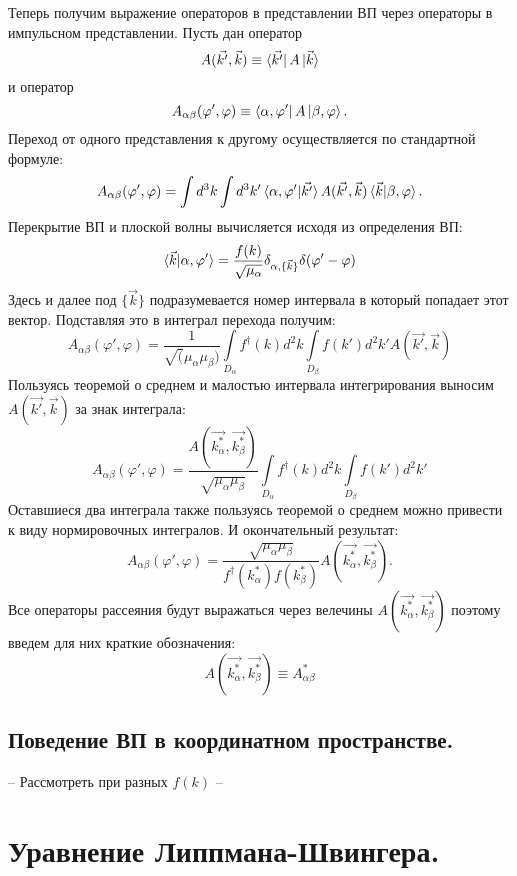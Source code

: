 \documentclass[a4paper,12pt]{article}
\begin{document}
Теперь получим выражение операторов в представлении ВП через операторы в импульсном представлении. Пусть дан оператор
\[
	A(\vec{k'},\vec{k}) \equiv \bra{\vec{k'}}A\ket{\vec{k}}
\] и оператор \[
  A_{\alpha\beta}(\varphi',\varphi) \equiv \bra{\alpha,\varphi'}A\ket{\beta,\varphi}.
\]
Переход от одного представления к другому осуществляется по стандартной формуле:
\[
	A_{\alpha\beta}(\varphi',\varphi) = \int d^3k \int d^3k' \braket{\alpha,\varphi'|\vec{k'}} A(\vec{k'},\vec{k}) \braket{\vec{k}|\beta,\varphi}.
\] 
Перекрытие ВП и плоской волны вычисляется исходя из определения ВП:
\[
 \braket{\vec{k}|\alpha,\varphi'} = \frac{f(k)}{\sqrt{\mu_\alpha}} \delta_{\alpha,\{\vec{k}\}} \delta(\varphi'-\varphi)
\]
Здесь и далее под $\{\vec{k}\}$ подразумевается номер интервала в который попадает этот вектор. Подставляя это в интеграл перехода получим:
\[
 A_{\alpha\beta}(\varphi',\varphi) = \frac{1}{\sqrt(\mu_\alpha \mu_\beta)} \int\limits_{D_\alpha} f^\dagger(k) d^2k \int\limits_{D_\beta} f(k') d^2k' A(\vec{k'},\vec{k})
\] Пользуясь теоремой о среднем и малостью интервала интегрирования выносим $A(\vec{k'},\vec{k})$ за знак интеграла:
\[
 A_{\alpha\beta}(\varphi',\varphi) = \frac{A(\vec{k^*_\alpha},\vec{k^*_\beta})}{\sqrt{\mu_\alpha \mu_\beta}} \int\limits_{D_\alpha} f^\dagger(k) d^2k \int\limits_{D_\beta} f(k') d^2k'
\] Оставшиеся два интеграла также пользуясь теоремой о среднем можно привести к виду нормировочных интегралов. И окончательный результат:
\[
 A_{\alpha\beta}(\varphi',\varphi) = \frac{\sqrt{\mu_\alpha \mu_\beta}}{ f^\dagger(k_\alpha^*)f(k_\beta^*) }  A(\vec{k^*_\alpha},\vec{k^*_\beta}).
\]
Все операторы рассеяния будут выражаться через велечины $A(\vec{k^*_\alpha},\vec{k^*_\beta})$ поэтому введем для них краткие обозначения:
\begin{equation}
    \label{mesh_oper}
    A(\vec{k^*_\alpha},\vec{k^*_\beta}) \equiv A^*_{\alpha\beta}
\end{equation}

\subsection{Поведение ВП в координатном пространстве.}
-- Рассмотреть при разных $f(k)$ --




\section{Уравнение Липпмана-Швингера.}
\end{document}
